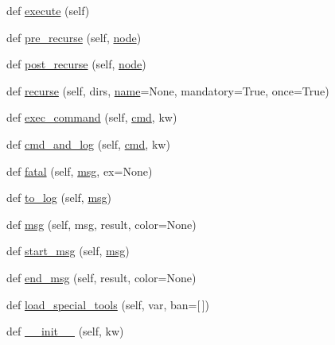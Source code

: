 \begin{DoxyCompactItemize}
\item 
def \hyperlink{classwaflib_1_1_context_1_1_context_ae98aa77cb954743799c5b730c6775329}{execute} (self)
\item 
def \hyperlink{classwaflib_1_1_context_1_1_context_a290c81ad18ad9b3c0bcbde2d8fce519e}{pre\+\_\+recurse} (self, \hyperlink{structnode}{node})
\item 
def \hyperlink{classwaflib_1_1_context_1_1_context_ab818cd610ecc0c6fa981f0cde9f3dd13}{post\+\_\+recurse} (self, \hyperlink{structnode}{node})
\item 
def \hyperlink{classwaflib_1_1_context_1_1_context_a10e3b0d5e63bb03a0a7adbb32c3dceab}{recurse} (self, dirs, \hyperlink{lib_2expat_8h_a1b49b495b59f9e73205b69ad1a2965b0}{name}=None, mandatory=True, once=True)
\item 
def \hyperlink{classwaflib_1_1_context_1_1_context_aaa7d209a0d05f2f8e45fc11b83c72dba}{exec\+\_\+command} (self, \hyperlink{sndfile__play_8m_adfc5ba7e22f5e4a6221c12a70503bef3}{cmd}, kw)
\item 
def \hyperlink{classwaflib_1_1_context_1_1_context_aaa63c5a7ac60f1bf164febe6642d270f}{cmd\+\_\+and\+\_\+log} (self, \hyperlink{sndfile__play_8m_adfc5ba7e22f5e4a6221c12a70503bef3}{cmd}, kw)
\item 
def \hyperlink{classwaflib_1_1_context_1_1_context_a42739307965d7ef470985d7bb7408788}{fatal} (self, \hyperlink{classwaflib_1_1_context_1_1_context_a7495a2e04e528aa54bda3cadf08240cb}{msg}, ex=None)
\item 
def \hyperlink{classwaflib_1_1_context_1_1_context_a596fa2d8dc5a61602101f43ec1eb3e7e}{to\+\_\+log} (self, \hyperlink{classwaflib_1_1_context_1_1_context_a7495a2e04e528aa54bda3cadf08240cb}{msg})
\item 
def \hyperlink{classwaflib_1_1_context_1_1_context_a7495a2e04e528aa54bda3cadf08240cb}{msg} (self, msg, result, color=None)
\item 
def \hyperlink{classwaflib_1_1_context_1_1_context_a344a0dff2c7b0d2d76057d55b83c3f16}{start\+\_\+msg} (self, \hyperlink{classwaflib_1_1_context_1_1_context_a7495a2e04e528aa54bda3cadf08240cb}{msg})
\item 
def \hyperlink{classwaflib_1_1_context_1_1_context_a6340799a7fa4dc1230d13b7c08eec789}{end\+\_\+msg} (self, result, color=None)
\item 
def \hyperlink{classwaflib_1_1_context_1_1_context_a95a53e6c363450df77f847bec6c56696}{load\+\_\+special\+\_\+tools} (self, var, ban=\mbox{[}$\,$\mbox{]})
\item 
def \hyperlink{classwaflib_1_1_context_1_1_context_ab8fabf802b21a8a8e77c3e3811c58c84}{\+\_\+\+\_\+init\+\_\+\+\_\+} (self, kw)

\end{DoxyCompactItemize}

